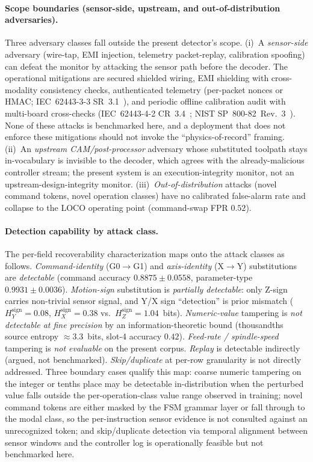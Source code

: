\documentclass[sensors,article,submit,moreauthors,pdftex]{Definitions/mdpi}
\begin{document}
\paragraph{Scope boundaries (sensor-side, upstream, and out-of-distribution adversaries).} Three adversary classes fall outside the present detector's scope. (i)~A \emph{sensor-side} adversary (wire-tap, EMI injection, telemetry packet-replay, calibration spoofing) can defeat the monitor by attacking the sensor path before the decoder. The operational mitigations are secured shielded wiring, EMI shielding with cross-modality consistency checks, authenticated telemetry (per-packet nonces or HMAC; IEC~62443-3-3 SR~3.1~\cite{iec62443-3-3}), and periodic offline calibration audit with multi-board cross-checks (IEC~62443-4-2 CR~3.4~\cite{iec62443-4-2}; NIST SP~800-82~Rev.~3~\cite{nist2023sp80082}). None of these attacks is benchmarked here, and a deployment that does not enforce these mitigations should not invoke the ``physics-of-record'' framing. (ii)~An \emph{upstream CAM/post-processor} adversary whose substituted toolpath stays in-vocabulary is invisible to the decoder, which agrees with the already-malicious controller stream; the present system is an execution-integrity monitor, not an upstream-design-integrity monitor. (iii)~\emph{Out-of-distribution} attacks (novel command tokens, novel operation classes) have no calibrated false-alarm rate and collapse to the LOCO operating point (command-swap FPR $0.52$).

\paragraph{Detection capability by attack class.} The per-field recoverability characterization maps onto the attack classes as follows. \emph{Command-identity} (G0$\to$G1) and \emph{axis-identity} (X$\to$Y) substitutions are \emph{detectable} (command accuracy $0.8875 \pm 0.0558$, parameter-type $0.9931 \pm 0.0036$). \emph{Motion-sign} substitution is \emph{partially detectable}: only Z-sign carries non-trivial sensor signal, and Y/X sign ``detection'' is prior mismatch ($H_{Y}^{\text{sign}}\!=\!0.08$, $H_{X}^{\text{sign}}\!=\!0.38$ vs.\ $H_{Z}^{\text{sign}}\!=\!1.04$~bits). \emph{Numeric-value} tampering is \emph{not detectable at fine precision} by an information-theoretic bound (thousandths source entropy $\approx 3.3$~bits, slot-4 accuracy $0.42$). \emph{Feed-rate / spindle-speed} tampering is \emph{not evaluable} on the present corpus. \emph{Replay} is detectable indirectly (argued, not benchmarked). \emph{Skip/duplicate} at per-row granularity is not directly addressed. Three boundary cases qualify this map: coarse numeric tampering on the integer or tenths place may be detectable in-distribution when the perturbed value falls outside the per-operation-class value range observed in training; novel command tokens are either masked by the FSM grammar layer or fall through to the modal class, so the per-instruction sensor evidence is not consulted against an unrecognized token; and skip/duplicate detection via temporal alignment between sensor windows and the controller log is operationally feasible but not benchmarked here.
\end{document}
